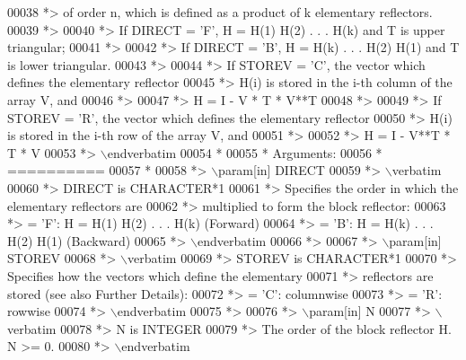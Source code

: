 \begin{DoxyCode}
00038 \textcolor{comment}{*> of order n, which is defined as a product of k elementary reflectors.}
00039 \textcolor{comment}{*>}
00040 \textcolor{comment}{*> If DIRECT = 'F', H = H(1) H(2) . . . H(k) and T is upper triangular;}
00041 \textcolor{comment}{*>}
00042 \textcolor{comment}{*> If DIRECT = 'B', H = H(k) . . . H(2) H(1) and T is lower triangular.}
00043 \textcolor{comment}{*>}
00044 \textcolor{comment}{*> If STOREV = 'C', the vector which defines the elementary reflector}
00045 \textcolor{comment}{*> H(i) is stored in the i-th column of the array V, and}
00046 \textcolor{comment}{*>}
00047 \textcolor{comment}{*>    H  =  I - V * T * V**T}
00048 \textcolor{comment}{*>}
00049 \textcolor{comment}{*> If STOREV = 'R', the vector which defines the elementary reflector}
00050 \textcolor{comment}{*> H(i) is stored in the i-th row of the array V, and}
00051 \textcolor{comment}{*>}
00052 \textcolor{comment}{*>    H  =  I - V**T * T * V}
00053 \textcolor{comment}{*> \(\backslash\)endverbatim}
00054 \textcolor{comment}{*}
00055 \textcolor{comment}{*  Arguments:}
00056 \textcolor{comment}{*  ==========}
00057 \textcolor{comment}{*}
00058 \textcolor{comment}{*> \(\backslash\)param[in] DIRECT}
00059 \textcolor{comment}{*> \(\backslash\)verbatim}
00060 \textcolor{comment}{*>          DIRECT is CHARACTER*1}
00061 \textcolor{comment}{*>          Specifies the order in which the elementary reflectors are}
00062 \textcolor{comment}{*>          multiplied to form the block reflector:}
00063 \textcolor{comment}{*>          = 'F': H = H(1) H(2) . . . H(k) (Forward)}
00064 \textcolor{comment}{*>          = 'B': H = H(k) . . . H(2) H(1) (Backward)}
00065 \textcolor{comment}{*> \(\backslash\)endverbatim}
00066 \textcolor{comment}{*>}
00067 \textcolor{comment}{*> \(\backslash\)param[in] STOREV}
00068 \textcolor{comment}{*> \(\backslash\)verbatim}
00069 \textcolor{comment}{*>          STOREV is CHARACTER*1}
00070 \textcolor{comment}{*>          Specifies how the vectors which define the elementary}
00071 \textcolor{comment}{*>          reflectors are stored (see also Further Details):}
00072 \textcolor{comment}{*>          = 'C': columnwise}
00073 \textcolor{comment}{*>          = 'R': rowwise}
00074 \textcolor{comment}{*> \(\backslash\)endverbatim}
00075 \textcolor{comment}{*>}
00076 \textcolor{comment}{*> \(\backslash\)param[in] N}
00077 \textcolor{comment}{*> \(\backslash\)verbatim}
00078 \textcolor{comment}{*>          N is INTEGER}
00079 \textcolor{comment}{*>          The order of the block reflector H. N >= 0.}
00080 \textcolor{comment}{*> \(\backslash\)endverbatim}

\end{DoxyCode}
